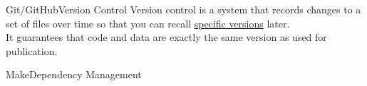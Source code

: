 \documentclass[12pt,t]{beamer}
\begin{document}
{{
  \begin{frame}[plain]
  \end{frame}
}
{
  \begin{frame}[plain]
  \end{frame}
}
\begin{frame}[c]{Git/GitHub\textemdash{}Version Control}
  Version control is a system that records changes to a set of files
  over time so that you can recall \href{https://github.com/aaronpeikert/reproducible-research/blame/master/manuscript.Rmd}{specific versions} later.\\
  \vspace{10mm}
  It guarantees that code and data are exactly the same version as used for
  publication.
\end{frame}

\begin{frame}[c, fragile]{Make\textemdash{}Dependency Management}


\end{frame}}
\end{document}
